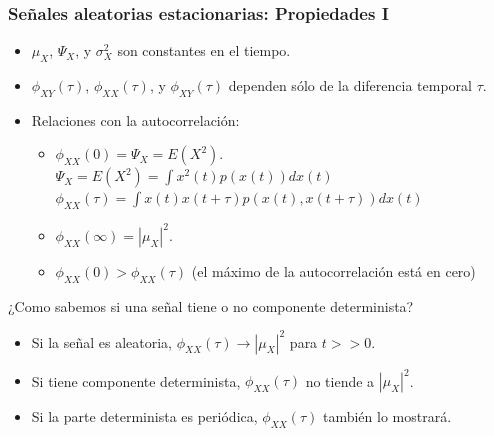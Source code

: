 \documentclass{beamer}
\numberwithin{section}{part}
\begin{document}
\begin{frame}
  \frametitle{Señales aleatorias estacionarias: Propiedades I}
  \footnotesize

  \begin{itemize}
    \item $\mu_X$, $\Psi_X$, y $\sigma_X^2$ son constantes en el tiempo.
    \item $\phi_{XY}(\tau)$, $\phi_{XX}(\tau)$, y $\phi_{XY}(\tau)$ dependen sólo de la diferencia temporal $\tau$.
    \item Relaciones con la autocorrelación:
    \begin{itemize}
      \footnotesize
      \item $\phi_{XX}(0)=\Psi_X=E(X^2)$.\\
      {\scriptsize\color{gray}%
      $\Psi_X=E(X^2)=\int x^2(t) p(x(t))dx(t)$\\
      $\phi_{XX}(\tau)=\int x(t)x(t+\tau) p(x(t),x(t+\tau))dx(t)$
      }
      \item $\phi_{XX}(\infty)=|\mu_X|^2.$
      \item $\phi_{XX}(0)>\phi_{XX}(\tau)$  (el máximo de la autocorrelación está en cero)
    \end{itemize}
  \end{itemize}
  \begin{alertblock}{¿Como sabemos si una señal tiene o no componente determinista?}
    \begin{itemize}
      \item Si la señal es aleatoria, $\phi_{XX}(\tau)\rightarrow|\mu_X|^2$ para $t>>0$.
      \item Si tiene componente determinista, $\phi_{XX}(\tau)$ no tiende a $|\mu_X|^2$.
      \item Si la parte determinista es periódica, $\phi_{XX}(\tau)$ también lo mostrará.
    \end{itemize}
\end{alertblock}
\end{frame}

\end{document}
